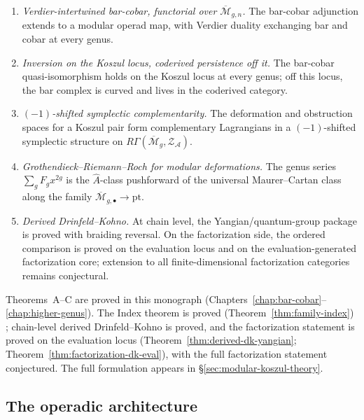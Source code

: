 \begin{enumerate}
\item[$A_{\mathrm{mod}}$.]
 \emph{Verdier-intertwined bar-cobar, functorial over
 $\overline{\mathcal{M}}_{g,n}$.}
 The bar-cobar adjunction extends to a modular operad map,
 with Verdier duality exchanging bar and cobar at every genus.

\item[$B_{\mathrm{mod}}$.]
 \emph{Inversion on the Koszul locus, coderived persistence off it.}
 The bar-cobar quasi-isomorphism holds on the Koszul locus at
 every genus; off this locus, the bar complex is curved and lives
 in the coderived category.

\item[$C_{\mathrm{mod}}$.]
 \emph{$(-1)$-shifted symplectic complementarity.}
 The deformation and obstruction spaces for a Koszul pair form
 complementary Lagrangians in a $(-1)$-shifted symplectic
 structure on $R\Gamma(\overline{\mathcal{M}}_g,
 \mathcal{Z}_{\mathcal{A}})$.

\item[\textbf{Index}.]
 \emph{Grothendieck--Riemann--Roch for modular deformations.}
 The genus series $\sum_g F_g x^{2g}$ is the $\hat{A}$-class
 pushforward of the universal Maurer--Cartan class along the
 family $\overline{\mathcal{M}}_{g,\bullet} \to \mathrm{pt}$.

\item[\textbf{DK}.]
 \emph{Derived Drinfeld--Kohno.}
 At chain level, the Yangian/quantum-group package is proved with
 braiding reversal. On the factorization side, the ordered
 comparison is proved on the evaluation locus and on the
 evaluation-generated factorization core; extension to all
 finite-dimensional factorization categories remains conjectural.
\end{enumerate}

Theorems~A--C are proved in this monograph
(Chapters~\ref{chap:bar-cobar}--\ref{chap:higher-genus}).
The Index theorem is proved \ifannalsedition\else
(Theorem~\ref{thm:family-index})
\fi;
chain-level derived Drinfeld--Kohno is proved, and the
factorization statement is proved on the evaluation locus
(Theorem~\ref{thm:derived-dk-yangian};
Theorem~\ref{thm:factorization-dk-eval}), with the full
factorization statement conjectured.
The full formulation appears in
\ifannalsedition\else
\S\ref{sec:modular-koszul-theory}.
\fi

\subsection{The operadic architecture}
\label{subsec:frame-operadic-architecture}

